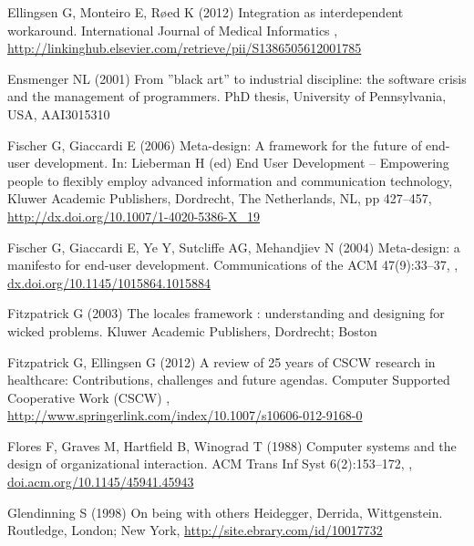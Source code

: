 \documentclass{article}
\begin{document}
\begin{thebibliography}{193}
Ellingsen G, Monteiro E, Røed K (2012) Integration as interdependent
  workaround. International Journal of Medical Informatics
  ,
  \urlprefix\url{http://linkinghub.elsevier.com/retrieve/pii/S1386505612001785}

Ensmenger NL (2001) From ''black art'' to industrial discipline: the software
  crisis and the management of programmers. PhD thesis, University of
  Pennsylvania, {USA}, {AAI3015310}

Fischer G, Giaccardi E (2006) Meta-design: A framework for the future of
  end-user development. In: Lieberman H (ed) End User Development -- Empowering
  people to flexibly employ advanced information and communication technology,
  Kluwer Academic Publishers, Dordrecht, The Netherlands, {NL}, pp 427--457,
  \urlprefix\url{http://dx.doi.org/10.1007/1-4020-5386-X_19}

Fischer G, Giaccardi E, Ye Y, Sutcliffe AG, Mehandjiev N (2004) Meta-design: a
  manifesto for end-user development. Communications of the {ACM} 47(9):33--37,
  ,
  \urlprefix\url{dx.doi.org/10.1145/1015864.1015884}

Fitzpatrick G (2003) The locales framework : understanding and designing for
  wicked problems. Kluwer Academic Publishers, Dordrecht; Boston

Fitzpatrick G, Ellingsen G (2012) A review of 25 years of {CSCW} research in
  healthcare: Contributions, challenges and future agendas. Computer Supported
  Cooperative Work {(CSCW)} ,
  \urlprefix\url{http://www.springerlink.com/index/10.1007/s10606-012-9168-0}

Flores F, Graves M, Hartfield B, Winograd T (1988) Computer systems and the
  design of organizational interaction. {ACM} Trans Inf Syst 6(2):153--172,
  , \urlprefix\url{doi.acm.org/10.1145/45941.45943}

Glendinning S (1998) On being with others Heidegger, Derrida, Wittgenstein.
  Routledge, London; New York,
  \urlprefix\url{http://site.ebrary.com/id/10017732}


\end{thebibliography}
\end{document}
